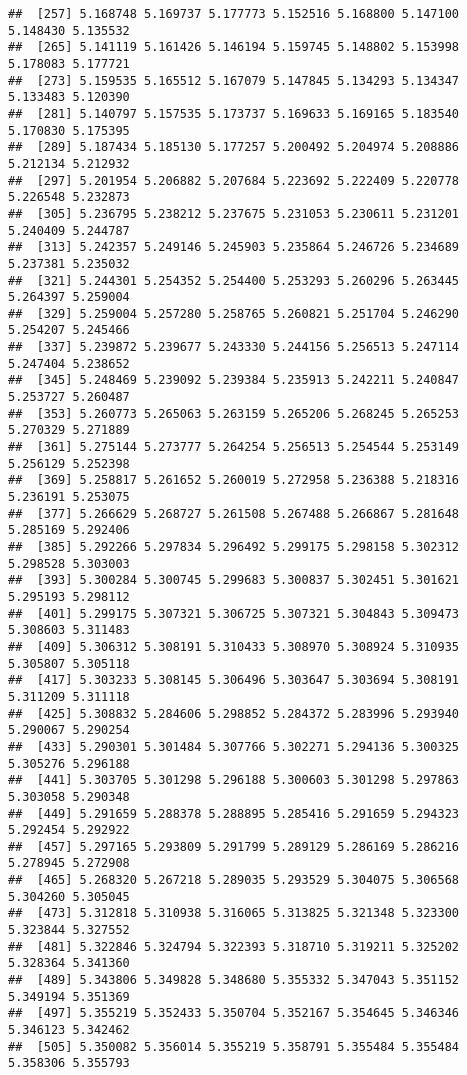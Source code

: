 \documentclass[
]{article}
\begin{document}
\begin{verbatim}
##  [257] 5.168748 5.169737 5.177773 5.152516 5.168800 5.147100 5.148430 5.135532
##  [265] 5.141119 5.161426 5.146194 5.159745 5.148802 5.153998 5.178083 5.177721
##  [273] 5.159535 5.165512 5.167079 5.147845 5.134293 5.134347 5.133483 5.120390
##  [281] 5.140797 5.157535 5.173737 5.169633 5.169165 5.183540 5.170830 5.175395
##  [289] 5.187434 5.185130 5.177257 5.200492 5.204974 5.208886 5.212134 5.212932
##  [297] 5.201954 5.206882 5.207684 5.223692 5.222409 5.220778 5.226548 5.232873
##  [305] 5.236795 5.238212 5.237675 5.231053 5.230611 5.231201 5.240409 5.244787
##  [313] 5.242357 5.249146 5.245903 5.235864 5.246726 5.234689 5.237381 5.235032
##  [321] 5.244301 5.254352 5.254400 5.253293 5.260296 5.263445 5.264397 5.259004
##  [329] 5.259004 5.257280 5.258765 5.260821 5.251704 5.246290 5.254207 5.245466
##  [337] 5.239872 5.239677 5.243330 5.244156 5.256513 5.247114 5.247404 5.238652
##  [345] 5.248469 5.239092 5.239384 5.235913 5.242211 5.240847 5.253727 5.260487
##  [353] 5.260773 5.265063 5.263159 5.265206 5.268245 5.265253 5.270329 5.271889
##  [361] 5.275144 5.273777 5.264254 5.256513 5.254544 5.253149 5.256129 5.252398
##  [369] 5.258817 5.261652 5.260019 5.272958 5.236388 5.218316 5.236191 5.253075
##  [377] 5.266629 5.268727 5.261508 5.267488 5.266867 5.281648 5.285169 5.292406
##  [385] 5.292266 5.297834 5.296492 5.299175 5.298158 5.302312 5.298528 5.303003
##  [393] 5.300284 5.300745 5.299683 5.300837 5.302451 5.301621 5.295193 5.298112
##  [401] 5.299175 5.307321 5.306725 5.307321 5.304843 5.309473 5.308603 5.311483
##  [409] 5.306312 5.308191 5.310433 5.308970 5.308924 5.310935 5.305807 5.305118
##  [417] 5.303233 5.308145 5.306496 5.303647 5.303694 5.308191 5.311209 5.311118
##  [425] 5.308832 5.284606 5.298852 5.284372 5.283996 5.293940 5.290067 5.290254
##  [433] 5.290301 5.301484 5.307766 5.302271 5.294136 5.300325 5.305276 5.296188
##  [441] 5.303705 5.301298 5.296188 5.300603 5.301298 5.297863 5.303058 5.290348
##  [449] 5.291659 5.288378 5.288895 5.285416 5.291659 5.294323 5.292454 5.292922
##  [457] 5.297165 5.293809 5.291799 5.289129 5.286169 5.286216 5.278945 5.272908
##  [465] 5.268320 5.267218 5.289035 5.293529 5.304075 5.306568 5.304260 5.305045
##  [473] 5.312818 5.310938 5.316065 5.313825 5.321348 5.323300 5.323844 5.327552
##  [481] 5.322846 5.324794 5.322393 5.318710 5.319211 5.325202 5.328364 5.341360
##  [489] 5.343806 5.349828 5.348680 5.355332 5.347043 5.351152 5.349194 5.351369
##  [497] 5.355219 5.352433 5.350704 5.352167 5.354645 5.346346 5.346123 5.342462
##  [505] 5.350082 5.356014 5.355219 5.358791 5.355484 5.355484 5.358306 5.355793

\end{verbatim}
\end{document}
